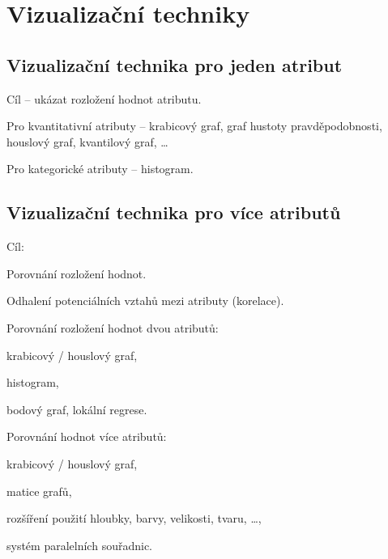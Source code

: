 
\section{Vizualizační techniky}

\subsection{Vizualizační technika pro jeden atribut}

\begin{compactitem}
    \item Cíl -- ukázat rozložení hodnot atributu.

    \item Pro kvantitativní atributy -- krabicový graf, graf hustoty pravděpodobnosti, houslový graf, kvantilový graf, \dots

    \item Pro kategorické atributy -- histogram.
\end{compactitem}

\subsection{Vizualizační technika pro více atributů}

\begin{compactitem}
    \item Cíl: \begin{compactitem}
        \item Porovnání rozložení hodnot.

        \item Odhalení potenciálních vztahů mezi atributy (korelace).
    \end{compactitem}

    \item Porovnání rozložení hodnot dvou atributů: \begin{compactitem}
        \item krabicový / houslový graf,
        \item histogram,
        \item bodový graf, lokální regrese.
    \end{compactitem}

    \item Porovnání hodnot více atributů: \begin{compactitem}
        \item krabicový / houslový graf,
        \item matice grafů,
        \item rozšíření použití hloubky, barvy, velikosti, tvaru, \dots,
        \item systém paralelních souřadnic.
    \end{compactitem}
\end{compactitem}

